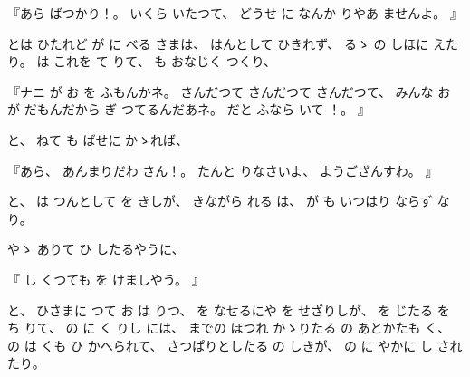 
%
『あら
ばつかり！。
%
いくら
いたつて、
%
どうせ
に
なんか
りやあ
ませんよ。
』

%
とは
ひたれど
が
に
べる
さまは、
%
はんとして
ひきれず、
%
るゝ
の
しほに
えたり。
%
は
これを
て
りて、
%
も
おなじく
つくり、

%
『ナニ
が
お
を
ふもんかネ。
%
さんだつて
さんだつて
さんだつて、
%
みんな
お
が
だもんだから
ぎ
つてるんだあネ。
%
だと
ふなら
いて
！。
』

%
と、
%
ねて
も
ばせに
かゝれば、

%
『あら、
%
あんまりだわ
さん！。
%
たんと
りなさいよ、
%
ようござんすわ。
』

%
と、
%
は
つんとして
を
きしが、
%
きながら
れる
は、
%
が
も
いつはり
ならず
なり。%

%
やゝ
ありて
ひ
したるやうに、

%
『
し
くつても
を
けましやう。
』

%
と、
%
ひさまに
つて
お
は
りつ、
%
を
なせるにや
を
せざりしが、
%
を
じたる
を
ち
りて、
%
の
に
く
りし
には、
%
までの
ほつれ
かゝりたる
の
あとかたも
く、
%
の
は
くも
ひ
かへられて、
%
さつぱりとしたる
の
しきが、
%
の
に
やかに
し
されたり。


